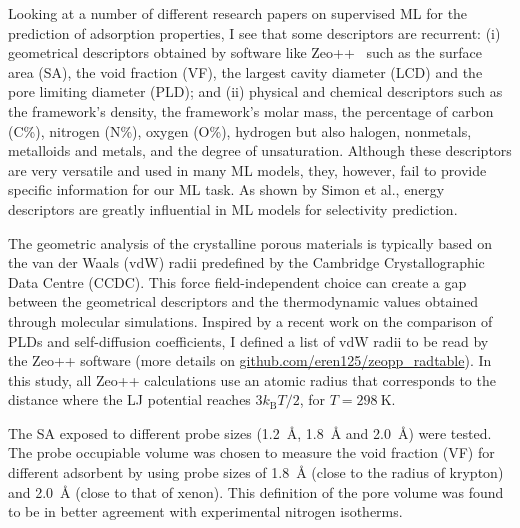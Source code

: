 \documentclass[main]{subfiles}
\begin{document}
Looking at a number of different research papers on supervised ML for the prediction of adsorption properties,\autocite{Fernandez_2013,Simon_2015,Fanourgakis_2020,Anderson_2020,Pardakhti_2020} I see that some descriptors are recurrent: (i) geometrical descriptors obtained by software like Zeo++~\autocite{zeopp_Willems2012} such as the surface area (SA), the void fraction (VF), the largest cavity diameter (LCD) and the pore limiting diameter (PLD); and (ii) physical and chemical descriptors such as the framework's density, the framework's molar mass, the percentage of carbon (C\%), nitrogen (N\%), oxygen (O\%), hydrogen but also halogen, nonmetals, metalloids and metals, and the degree of unsaturation. Although these descriptors are very versatile and used in many ML models, they, however, fail to provide specific information for our ML task. As shown by Simon et al., energy descriptors are greatly influential in ML models for selectivity prediction.

The geometric analysis of the crystalline porous materials is typically based on the van der Waals (vdW) radii predefined by the Cambridge Crystallographic Data Centre (CCDC). This force field-independent choice can create a gap between the geometrical descriptors and the thermodynamic values obtained through molecular simulations. Inspired by a recent work on the comparison of PLDs and self-diffusion coefficients,\autocite{Hung_2021} I defined a list of vdW radii to be read by the Zeo++ software (more details on \url{github.com/eren125/zeopp_radtable}). In this study, all Zeo++ calculations use an atomic radius that corresponds to the distance where the LJ potential reaches $3 k_\text{B} T/2$, for $T = \SI{298}{\kelvin}$.

The SA exposed to different probe sizes (\SI{1.2}{\angstrom}, \SI{1.8}{\angstrom} and \SI{2.0}{\angstrom}) were tested. The probe occupiable volume was chosen to measure the void fraction (VF) for different adsorbent by using probe sizes of \SI{1.8}{\angstrom} (close to the radius of krypton) and \SI{2.0}{\angstrom} (close to that of xenon). This definition of the pore volume was found to be in better agreement with experimental nitrogen isotherms.\autocite{vol_Ongari2017}
\end{document}
